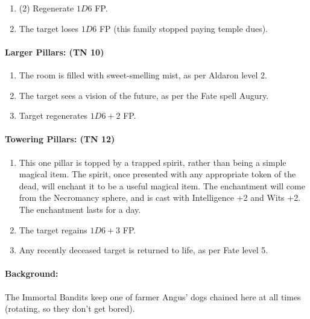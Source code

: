 \begin{multicols}{2}
\begin{enumerate}
  \item{(2) Regenerate $1D6$ FP.}
  \item{The target loses $1D6$ FP (this family stopped paying temple dues).}
\end{enumerate}

\paragraph{Larger Pillars: (TN 10)}

\begin{enumerate}

  \item{The room is filled with sweet-smelling mist, as per Aldaron level 2.}
  \item{The target sees a vision of the future, as per the Fate spell Augury.}
  \item{Target regenerates $1D6+2$ FP.}
\end{enumerate}

\paragraph{Towering Pillars: (TN 12)}

\begin{enumerate}

  \item{This one pillar is topped by a trapped spirit, rather than being a simple magical item.  The spirit, once presented with any appropriate token of the dead, will enchant it to be a useful magical item.  The enchantment will come from the Necromancy sphere, and is cast with Intelligence +2 and Wits +2.  The enchantment lasts for a day.}
  \item{The target regains $1D6+3$ FP.}
  \item{Any recently deceased target is returned to life, as per Fate level 5.}

\end{enumerate}

\label{sewerDog}

\paragraph{Background:}
The Immortal Bandits keep one of farmer Angus' dogs chained here at all times (rotating, so they don't get bored).

\begin{boxtext}


\end{boxtext}
\end{multicols}
